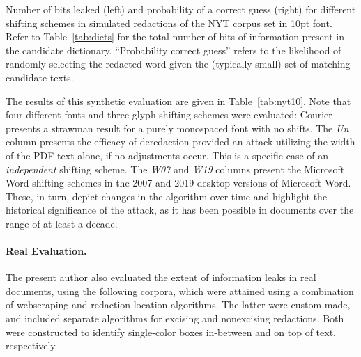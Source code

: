 \begin{table}
\centering\small
\caption{Number of bits leaked (left) and probability of a correct guess (right) for different shifting schemes in simulated redactions of the NYT corpus set in 10pt font.
    Refer to Table~\ref{tab:dicts} for the total number of bits of information present in the candidate dictionary.
    ``Probability correct guess'' refers to the likelihood of randomly selecting the redacted word given the (typically small) set of matching candidate texts.
    }
\label{tab:nyt10}

\end{table}

The results of this synthetic evaluation are given in Table~\ref{tab:nyt10}.
Note that four different fonts and three glyph shifting schemes were evaluated: Courier presents a strawman result for a purely monospaced font with no shifts.
The \emph{Un} column presents the efficacy of deredaction provided an attack utilizing the width of the PDF text alone, if no adjustments occur.
This is a specific case of an \emph{independent} shifting scheme.
The \emph{W07} and \emph{W19} columns present the Microsoft Word shifting schemes in the 2007 and 2019 desktop versions of Microsoft Word.
These, in turn, depict changes in the algorithm over time and highlight the historical significance of the attack, as it has been possible in documents over the range of at least a decade.

\paragraph{Real Evaluation.}
The present author also evaluated the extent of information leaks in real documents, using the following corpora, which were attained using a combination of webscraping and redaction location algorithms.
The latter were custom-made, and included separate algorithms for excising and nonexcising redactions.
Both were constructed to identify single-color boxes in-between and on top of text, respectively.

